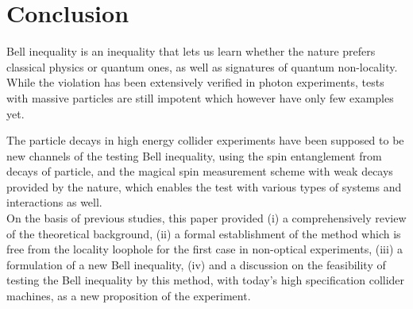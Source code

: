 \setlength{\topmargin}{-1.5cm}
\setlength{\oddsidemargin}{-0.3cm}
\setlength{\evensidemargin}{-0.3cm}
\setlength{\textwidth}{16.5cm}
\setlength{\textheight}{23cm}



%

\chapter{Conclusion} 
Bell inequality is an inequality that lets us learn whether the nature prefers classical physics or quantum ones, as well as signatures of quantum non-locality. While the violation has been extensively verified  in photon experiments, tests with massive particles are still impotent which however have only few examples yet.  

The particle decays in high energy collider experiments have been supposed to be new channels of the testing Bell inequality, using the spin entanglement from decays of particle, and the magical spin measurement scheme with weak decays provided by the nature, which enables the test with various types of systems and interactions as well. \\

On the basis of previous studies, this paper provided (i) a comprehensively review of the theoretical background, (ii) a formal establishment of the method which is free from the locality loophole for the first case in non-optical experiments, (iii) a formulation of a new Bell inequality, (iv) and a discussion on the feasibility of testing the Bell inequality by this method, with today's high specification collider machines, as a new proposition of the experiment. \\

%


%
